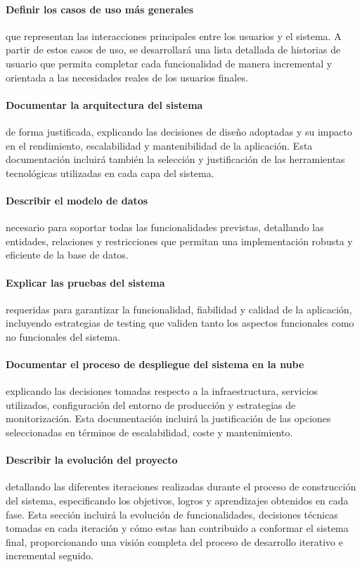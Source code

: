 \paragraph*{Definir los casos de uso más generales}
que representan las interacciones principales entre los usuarios y el sistema. A partir de estos casos de uso, se desarrollará una lista detallada de historias de usuario que permita completar cada funcionalidad de manera incremental y orientada a las necesidades reales de los usuarios finales.

\paragraph*{Documentar la arquitectura del sistema}
de forma justificada, explicando las decisiones de diseño adoptadas y su impacto en el rendimiento, escalabilidad y mantenibilidad de la aplicación. Esta documentación incluirá también la selección y justificación de las herramientas tecnológicas utilizadas en cada capa del sistema.

\paragraph*{Describir el modelo de datos}
necesario para soportar todas las funcionalidades previstas, detallando las entidades, relaciones y restricciones que permitan una implementación robusta y eficiente de la base de datos.

\paragraph*{Explicar las pruebas del sistema}
requeridas para garantizar la funcionalidad, fiabilidad y calidad de la aplicación, incluyendo estrategias de testing que validen tanto los aspectos funcionales como no funcionales del sistema.

\paragraph*{Documentar el proceso de despliegue del sistema en la nube}
explicando las decisiones tomadas respecto a la infraestructura, servicios utilizados, configuración del entorno de producción y estrategias de monitorización. Esta documentación incluirá la justificación de las opciones seleccionadas en términos de escalabilidad, coste y mantenimiento.

\paragraph*{Describir la evolución del proyecto}
detallando las diferentes iteraciones realizadas durante el proceso de construcción del sistema, especificando los objetivos, logros y aprendizajes obtenidos en cada fase. Esta sección incluirá la evolución de funcionalidades, decisiones técnicas tomadas en cada iteración y cómo estas han contribuido a conformar el sistema final, proporcionando una visión completa del proceso de desarrollo iterativo e incremental seguido.


